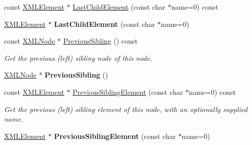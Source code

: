 \begin{DoxyCompactItemize}
\item 
const \hyperlink{classtinyxml2_1_1_x_m_l_element}{X\+M\+L\+Element} $\ast$ \hyperlink{classtinyxml2_1_1_x_m_l_node_a91a59df4ae1b4eb7f573c0a4cfc81bee}{Last\+Child\+Element} (const char $\ast$name=0) const 
\item 
\hypertarget{classtinyxml2_1_1_x_m_l_node_a1b77a8194d059665a4412ebfea276878}{}\hyperlink{classtinyxml2_1_1_x_m_l_element}{X\+M\+L\+Element} $\ast$ {\bfseries Last\+Child\+Element} (const char $\ast$name=0)\label{classtinyxml2_1_1_x_m_l_node_a1b77a8194d059665a4412ebfea276878}

\item 
\hypertarget{classtinyxml2_1_1_x_m_l_node_a4cb1bf63e9de55129d21a7be60685fd4}{}const \hyperlink{classtinyxml2_1_1_x_m_l_node}{X\+M\+L\+Node} $\ast$ \hyperlink{classtinyxml2_1_1_x_m_l_node_a4cb1bf63e9de55129d21a7be60685fd4}{Previous\+Sibling} () const \label{classtinyxml2_1_1_x_m_l_node_a4cb1bf63e9de55129d21a7be60685fd4}

\begin{DoxyCompactList}\small\item\em Get the previous (left) sibling node of this node. \end{DoxyCompactList}\item 
\hypertarget{classtinyxml2_1_1_x_m_l_node_ae760e5e7e766df1d2cf3bb4a847876d6}{}\hyperlink{classtinyxml2_1_1_x_m_l_node}{X\+M\+L\+Node} $\ast$ {\bfseries Previous\+Sibling} ()\label{classtinyxml2_1_1_x_m_l_node_ae760e5e7e766df1d2cf3bb4a847876d6}

\item 
\hypertarget{classtinyxml2_1_1_x_m_l_node_aae864cedca1b711cf0e357fd6504a6d8}{}const \hyperlink{classtinyxml2_1_1_x_m_l_element}{X\+M\+L\+Element} $\ast$ \hyperlink{classtinyxml2_1_1_x_m_l_node_aae864cedca1b711cf0e357fd6504a6d8}{Previous\+Sibling\+Element} (const char $\ast$name=0) const \label{classtinyxml2_1_1_x_m_l_node_aae864cedca1b711cf0e357fd6504a6d8}

\begin{DoxyCompactList}\small\item\em Get the previous (left) sibling element of this node, with an optionally supplied name. \end{DoxyCompactList}\item 
\hypertarget{classtinyxml2_1_1_x_m_l_node_ae4f37eb6cd405bdf1d57caa066e36d87}{}\hyperlink{classtinyxml2_1_1_x_m_l_element}{X\+M\+L\+Element} $\ast$ {\bfseries Previous\+Sibling\+Element} (const char $\ast$name=0)\label{classtinyxml2_1_1_x_m_l_node_ae4f37eb6cd405bdf1d57caa066e36d87}


\end{DoxyCompactItemize}
